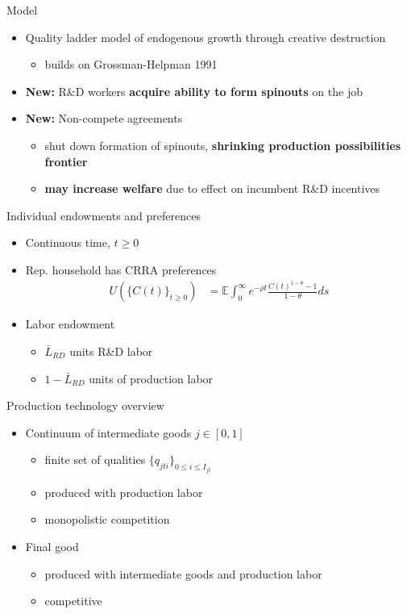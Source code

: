\documentclass[english,usenames,dvipsnames,handout]{beamer}
\begin{document}
\begin{frame}{Model}
	\begin{itemize}	
		\item Quality ladder model of endogenous growth through creative destruction 
		\begin{itemize}
			\item builds on Grossman-Helpman 1991
		\end{itemize}
		\medskip
		\item \alert{\textbf{New:}} R\&D workers \textbf{\alert{acquire ability to form spinouts}} on the job
		\medskip
		\item \alert{\textbf{New:}} Non-compete agreements
		\begin{itemize}
			\item shut down formation of spinouts, \textbf{\alert{shrinking production possibilities frontier}}
			\item \textbf{\alert{may increase welfare}} due to effect on incumbent R\&D incentives
		\end{itemize}
	\end{itemize}
\end{frame}


\begin{frame}{Individual endowments and preferences}
	\begin{itemize}
		\item Continuous time, $t \ge 0$
		\item Rep. household has CRRA preferences 
		\begin{align*}
		U(\{C(t)\}_{t \ge 0}) &= \mathbb{E} \int_0^{\infty} e^{-\rho t} \frac{C(t)^{1-\theta} - 1}{1 - \theta} ds
		\end{align*}
		\item Labor endowment
		\begin{itemize}
			\item $\bar{L}_{RD}$ units R\&D labor
			\item $1 - \bar{L}_{RD}$ units of production labor
		\end{itemize}
	\end{itemize}
\end{frame}

\begin{frame}{Production technology overview}
	\begin{itemize}
		\item Continuum of intermediate goods $j \in [0,1]$ 
		\begin{itemize}
			\item finite set of qualities $\{q_{jti}\}_{0 \le i \le I_{jt}}$
			\item produced with production labor 
			\item monopolistic competition
		\end{itemize}
		\smallskip
		\item Final good
		\begin{itemize}
			\item produced with intermediate goods and production labor
			\item competitive
		\end{itemize}
	\end{itemize}
\end{frame}
\end{document}
